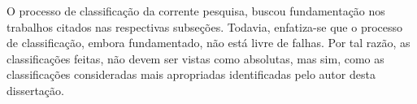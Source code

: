 O processo de classificação da corrente pesquisa, buscou fundamentação nos trabalhos citados nas respectivas subseções. Todavia, enfatiza-se que o processo de classificação, embora fundamentado, não está livre de falhas. Por tal razão, as classificações feitas, não devem ser vistas como absolutas, mas sim, como as classificações consideradas mais apropriadas identificadas pelo autor desta dissertação. 







